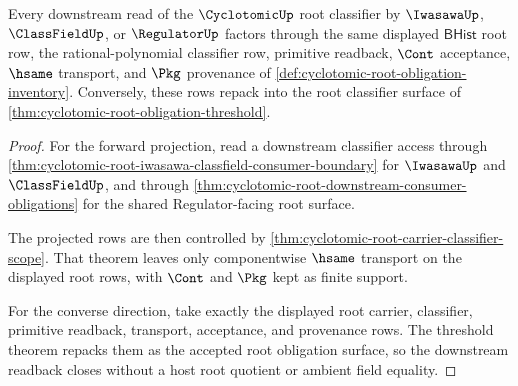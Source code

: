 \begin{theorem}
\label{thm:cyclotomic-root-classifier-readback-threshold}
Every downstream read of the $\CyclotomicUp$ root classifier by $\IwasawaUp$,
$\ClassFieldUp$, or $\RegulatorUp$ factors through the same displayed
$\mathsf{BHist}$ root row, the rational-polynomial classifier row, primitive
readback, $\Cont$ acceptance, $\hsame$ transport, and $\Pkg$ provenance of
\autoref{def:cyclotomic-root-obligation-inventory}. Conversely, these rows
repack into the root classifier surface of
\autoref{thm:cyclotomic-root-obligation-threshold}.
\end{theorem}
\begin{proof}
For the forward projection, read a downstream classifier access through
\autoref{thm:cyclotomic-root-iwasawa-classfield-consumer-boundary} for
$\IwasawaUp$ and $\ClassFieldUp$, and through
\autoref{thm:cyclotomic-root-downstream-consumer-obligations} for the shared
Regulator-facing root surface.

The projected rows are then controlled by
\autoref{thm:cyclotomic-root-carrier-classifier-scope}. That theorem leaves only
componentwise $\hsame$ transport on the displayed root rows, with $\Cont$ and
$\Pkg$ kept as finite support.

For the converse direction, take exactly the displayed root carrier, classifier,
primitive readback, transport, acceptance, and provenance rows. The threshold
theorem repacks them as the accepted root obligation surface, so the downstream
readback closes without a host root quotient or ambient field equality.
\end{proof}

